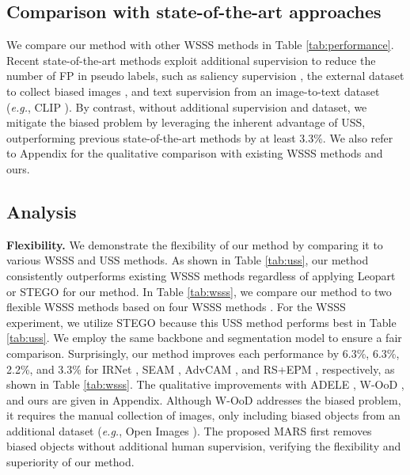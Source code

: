 \documentclass[10pt,twocolumn,letterpaper]{article}
\begin{document}
\subsection{Comparison with state-of-the-art approaches} 




We compare our method with other WSSS methods in Table \ref{tab:performance}. Recent state-of-the-art methods exploit additional supervision to reduce the number of FP in pseudo labels, such as saliency supervision \cite{hou2017deeply, liu2019simple, pang2020multi}, the external dataset to collect biased images \cite{lee2022weakly}, and text supervision from an image-to-text dataset (\emph{e.g.}, CLIP \cite{radford2021learning}). By contrast, without additional supervision and dataset, we mitigate the biased problem by leveraging the inherent advantage of USS, outperforming previous state-of-the-art methods by at least 3.3\%. We also refer to Appendix for the qualitative comparison with existing WSSS methods and ours.









\subsection{Analysis} \label{sec:analysis}







\textbf{Flexibility.} We demonstrate the flexibility of our method by comparing it to various WSSS and USS methods. As shown in Table \ref{tab:uss}, our method consistently outperforms existing WSSS methods regardless of applying Leopart \cite{ziegler2022self} or STEGO \cite{hamilton2022unsupervised} for our method. In Table \ref{tab:wsss}, we compare our method to two flexible WSSS methods \cite{liu2022adaptive, lee2022weakly} based on four WSSS methods \cite{ahn2019weakly, wang2020self, lee2021anti, jo2022recurseed}. For the WSSS experiment, we utilize STEGO \cite{hamilton2022unsupervised} because this USS method performs best in Table \ref{tab:uss}. We employ the same backbone and segmentation model to ensure a fair comparison. Surprisingly, our method improves each performance by 6.3\%, 6.3\%, 2.2\%, and 3.3\% for IRNet \cite{ahn2019weakly}, SEAM \cite{wang2020self}, AdvCAM \cite{lee2021anti}, and RS+EPM \cite{jo2022recurseed}, respectively, as shown in Table \ref{tab:wsss}. The qualitative improvements with ADELE \cite{liu2022adaptive}, W-OoD \cite{lee2022weakly}, and ours are given in Appendix. Although W-OoD \cite{lee2022weakly} addresses the biased problem, it requires the manual collection of images, only including biased objects from an additional dataset (\emph{e.g.}, Open Images \cite{kuznetsova2020open}). The proposed MARS first removes biased objects without additional human supervision, verifying the flexibility and superiority of our method.
\end{document}
